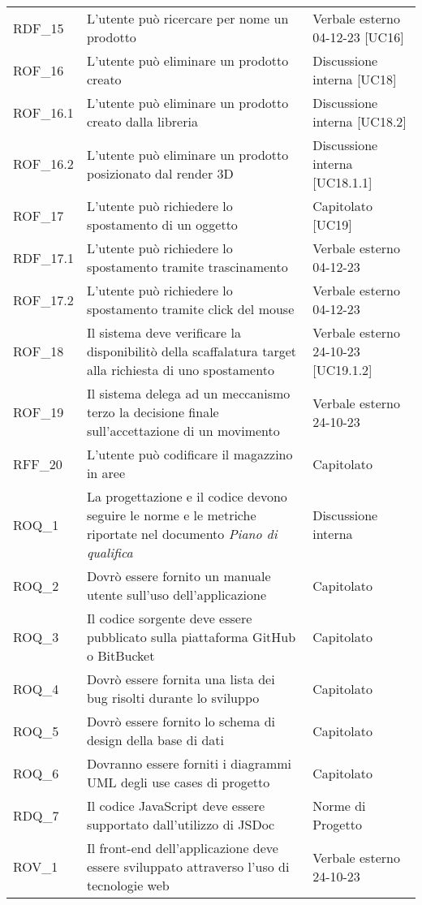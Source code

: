 \begin{xltabular}{\textwidth}{ p{0.2\textwidth} | X | p{0.2\textwidth} }
    RDF\_15& L'utente può ricercare per nome un prodotto & Verbale esterno 04-12-23 [UC16]\\
    ROF\_16& L'utente può eliminare un prodotto creato & Discussione interna [UC18]\\
    ROF\_16.1& L'utente può eliminare un prodotto creato dalla libreria & Discussione interna [UC18.2]\\
    ROF\_16.2& L'utente può eliminare un prodotto posizionato dal render 3D & Discussione interna [UC18.1.1]\\
    ROF\_17& L'utente può richiedere lo spostamento di un oggetto & Capitolato [UC19]\\
    RDF\_17.1& L'utente può richiedere lo spostamento tramite trascinamento & Verbale esterno 04-12-23\\
    ROF\_17.2& L'utente può richiedere lo spostamento tramite click del mouse & Verbale esterno 04-12-23\\
    ROF\_18& Il sistema deve verificare la disponibilitò della scaffalatura target alla richiesta di uno spostamento & Verbale esterno 24-10-23 [UC19.1.2]\\
    ROF\_19& Il sistema delega ad un meccanismo terzo la decisione finale sull'accettazione di un movimento & Verbale esterno 24-10-23\\
    RFF\_20& L'utente può codificare il magazzino in aree & Capitolato \\
    ROQ\_1& La progettazione e il codice devono seguire le norme e le metriche riportate nel documento \textit{Piano di qualifica} & Discussione interna \\
    ROQ\_2& Dovrò essere fornito un manuale utente sull'uso dell'applicazione & Capitolato \\
    ROQ\_3& Il codice sorgente deve essere pubblicato sulla piattaforma GitHub o BitBucket & Capitolato \\
    ROQ\_4& Dovrò essere fornita una lista dei bug risolti durante lo sviluppo & Capitolato  \\
    ROQ\_5& Dovrò essere fornito lo schema di design della base di dati & Capitolato  \\
    ROQ\_6& Dovranno essere forniti i diagrammi UML degli use cases di progetto & Capitolato  \\
    RDQ\_7& Il codice JavaScript deve essere supportato dall'utilizzo di JSDoc & Norme di Progetto \\
    ROV\_1& Il front-end dell'applicazione deve essere sviluppato attraverso l'uso di tecnologie web & Verbale esterno 24-10-23 \\

\end{xltabular}
